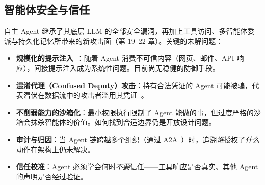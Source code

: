 \subsection{智能体安全与信任}
\label{agent-security-and-trust}

自主 Agent 继承了其底层 LLM 的全部安全漏洞，再加上工具访问、多智能体委派与持久化记忆所带来的新攻击面（第 19--22 章）。关键的未解问题：

\begin{itemize}
  \item \textbf{规模化的提示注入}~\cite{greshake2023indirect}：随着 Agent 消费不可信内容（网页、邮件、API 响应），间接提示注入成为系统性问题。目前尚无稳健的防御手段。
  \item \textbf{混淆代理（Confused Deputy）攻击}：持有合法凭证的 Agent 可能被骗，代表潜伏在数据流中的攻击者滥用其凭证~\cite{anthropic-mcp-2024}。
  \item \textbf{不削弱能力的沙箱化}：最小权限执行限制了 Agent 能做的事，但过度严格的沙箱会抹杀智能体的价值。如何找到合适边界仍是开放设计问题。
  \item \textbf{审计与归因}：当 Agent 链跨越多个组织（通过 A2A~\cite{google-a2a-2025}）时，追溯\emph{谁}授权了\emph{什么}动作在架构上仍未解决。
  \item \textbf{信任校准}：Agent 必须学会何时\emph{不要}信任——工具响应是否真实、其他 Agent 的声明是否经过验证。
\end{itemize}

